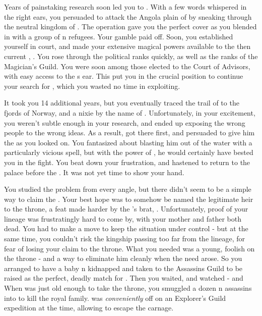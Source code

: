 \documentclass[char]{NeptuneBall}
\begin{document}
Years of painstaking research soon led you to \pAtlantis{}. With a few words whispered in the right ears, you persuaded \pPacifica{} to attack the Angola plain of \pAtlantis{} by sneaking through the neutral kingdom of \pIndia{}. The operation gave you the perfect cover as you blended in with a group of \pAtlantis{}n refugees. Your gamble paid off. Soon, you established yourself in court, and made your extensive magical powers available to the then current \cExKing{\King}, \cExKing{}. You rose through the political ranks quickly, as well as the ranks of the Magician's Guild. You were soon among those elected to the Court of Advisors, with easy access to the \cExKing{\King}s ear. This put you in the crucial position to continue your search for \iTrident{\MYname}, which you wasted no time in exploiting.

It took you 14 additional years, but you eventually traced the trail of \iTrident{\MYname} to the fjords of Norway, and a nixie by the name of \cNixie{}. Unfortunately, in your excitement, you weren't subtle enough in your research, and ended up exposing the wrong people to the wrong ideas. As a result, \cExKing{} got there first, and persuaded \cNixie{} to give him the \iTrident{\MYname} as you looked on. You fantasized about blasting him out of the water with a particularly vicious spell, but with the power of \iTrident{\MYname}, he would certainly have bested you in the fight. You beat down your frustration, and hastened to return to the palace before the \cExKing{\King}. It was not yet time to show your hand.

You studied the problem from every angle, but there didn't seem to be a simple way to claim the \iTrident{\MYname}. Your best hope was to somehow be named the legitimate heir to the throne, a feat made harder by the \cExKing{\King}'s brat, \cKing{}. Unfortunately, proof of your lineage was frustratingly hard to come by, with your mother and father both dead. You had to make a move to keep the situation under control - but at the same time, you couldn't risk the kingship passing too far from the \cExExKing{} lineage, for fear of losing your claim to the throne. What you needed was a young, foolish \cKing{\King} on the throne - and a way to eliminate him cleanly when the need arose. So you arranged to have a baby \pAtlantis{}n \cQueen{\kid} kidnapped and taken to the Assassins Guild to be raised as the perfect, deadly match for \cKing{}. Then you waited, and watched - and When \cKing{} was just old enough to take the throne, you smuggled a dozen \pPacifica{}n assassins into \pAtlantis{} to kill the royal family. \cKing{} was \emph{conveniently} off on an Explorer's Guild expedition at the time, allowing \cKing{\them} to escape the carnage.
\end{document}
